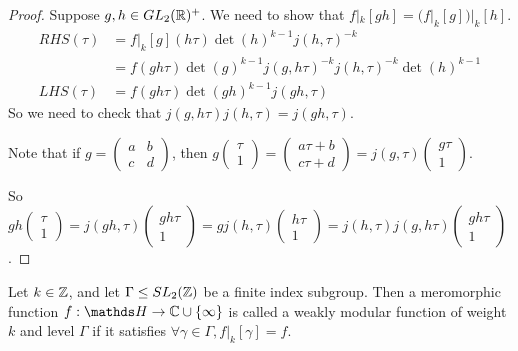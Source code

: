 \documentclass[10pt,a4paper]{article}
\begin{document}
\begin{proof}
  Suppose $g, h \in GL_2(\mathbb{R})^+$. We need to show that $f|_k[gh] = (f|_k[g])|_k[h]$.
  \begin{align*}
    RHS(\tau) &= f|_k[g](h\tau)\det(h)^{k-1}j(h, \tau)^{-k}\\
    &= f(gh\tau)\det(g)^{k-1}j(g, h\tau)^{-k}j(h,\tau)^{-k}\det(h)^{k-1}\\
    LHS(\tau) &= f(gh\tau)\det(gh)^{k-1}j(gh,\tau)
  \end{align*}
  So we need to check that $j(g, h\tau)j(h,\tau) = j(gh,\tau)$.

  Note that if $g = \begin{pmatrix}a&b\\c&d\end{pmatrix}$, then $g\begin{pmatrix}\tau\\1\end{pmatrix} = \begin{pmatrix}a\tau+b\\c\tau+d\end{pmatrix} = j(g,\tau)\begin{pmatrix}g\tau\\1\end{pmatrix}$.

  So $gh\begin{pmatrix}\tau\\1\end{pmatrix} = j(gh,\tau)\begin{pmatrix}gh\tau\\1\end{pmatrix} = gj(h,\tau)\begin{pmatrix}h\tau\\1\end{pmatrix} = j(h,\tau)j(g,h\tau)\begin{pmatrix}gh\tau\\1\end{pmatrix}$.
\end{proof}
\begin{definition}
  Let $k \in \mathbb{Z}$, and let $\Gamma \leq SL_2(\mathbb{Z})$ be a finite index subgroup. Then a meromorphic function $f:\H \to \C \cup\{\infty\}$ is called a weakly modular function of weight $k$ and level $\Gamma$ if it satisfies $\forall \gamma \in \Gamma, f|_k [\gamma] = f$.
\end{definition}
\end{document}
